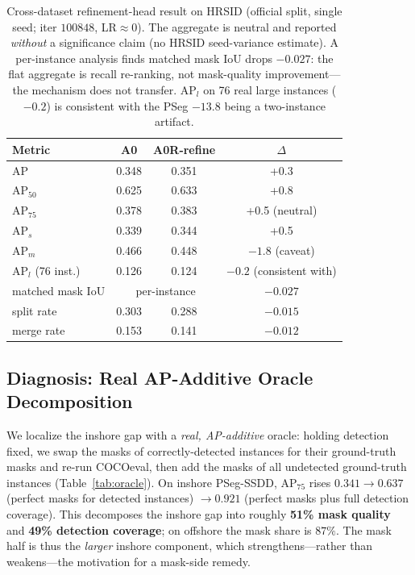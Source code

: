 \documentclass[journal]{IEEEtran}
\begin{document}
\begin{table}[t]
\centering
\caption{Cross-dataset refinement-head result on HRSID (official split, single seed; iter $100848$, LR$\approx0$). The aggregate is neutral and reported \emph{without} a significance claim (no HRSID seed-variance estimate). A per-instance analysis finds matched mask IoU drops $-0.027$: the flat aggregate is recall re-ranking, not mask-quality improvement---the mechanism does not transfer. AP$_{l}$ on 76 real large instances ($-0.2$) is consistent with the PSeg $-13.8$ being a two-instance artifact.}
\label{tab:main-hrsid}
\begin{tabular}{@{}lccc@{}}
\toprule
Metric & A0 & A0R-refine & $\Delta$ \\
\midrule
AP                  & 0.348 & 0.351 & +0.3 \\
AP$_{50}$           & 0.625 & 0.633 & +0.8 \\
AP$_{75}$           & 0.378 & 0.383 & +0.5 \;(neutral) \\
AP$_{s}$            & 0.339 & 0.344 & +0.5 \\
AP$_{m}$            & 0.466 & 0.448 & $-1.8$ \;(caveat) \\
AP$_{l}$ (76 inst.) & 0.126 & 0.124 & $-0.2$ \;(consistent with) \\
matched mask IoU    & \multicolumn{2}{c}{per-instance} & $-0.027$ \\
split rate          & 0.303 & 0.288 & $-0.015$ \\
merge rate          & 0.153 & 0.141 & $-0.012$ \\
\bottomrule
\end{tabular}
\end{table}

\subsection{Diagnosis: Real AP-Additive Oracle Decomposition}
\label{ssec:oracle}
We localize the inshore gap with a \emph{real, AP-additive} oracle: holding detection fixed, we swap the masks of correctly-detected instances for their ground-truth masks and re-run COCOeval, then add the masks of all undetected ground-truth instances (Table~\ref{tab:oracle}). On inshore PSeg-SSDD, AP$_{75}$ rises $0.341\!\rightarrow\!0.637$ (perfect masks for detected instances) $\rightarrow\!0.921$ (perfect masks plus full detection coverage). This decomposes the inshore gap into roughly \textbf{51\% mask quality} and \textbf{49\% detection coverage}; on offshore the mask share is $87\%$. The mask half is thus the \emph{larger} inshore component, which strengthens---rather than weakens---the motivation for a mask-side remedy.
\end{document}
